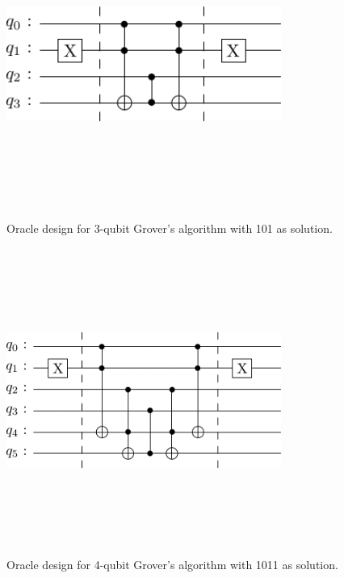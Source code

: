 \documentclass[conference]{IEEEtran}
\begin{document}
\begin{figure}[htbp]
	\centerline{\includegraphics[width=9cm,height=10cm,keepaspectratio]{3-qubit-101.png}}
	\caption{Oracle design for 3-qubit Grover’s algorithm with 101 as solution.}
	\label{fig:3-qubit}
\end{figure}

\begin{figure}[htbp]
	\centerline{\includegraphics[width=9cm,height=10cm,keepaspectratio]{4-qubit-1011.png}}
	\caption{Oracle design for 4-qubit Grover's algorithm with 1011 as solution.}
	\label{fig:4-qubit}
\end{figure}
\end{document}
